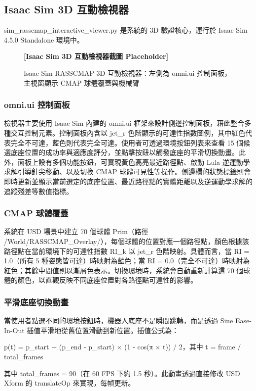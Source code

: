 \documentclass[a4paper, 12pt]{article}
\begin{document}
\subsection{Isaac Sim 3D 互動檢視器}
\label{subsec:sim_viewer}

sim\_rasscmap\_interactive\_viewer.py 是系統的 3D 驗證核心，運行於 Isaac Sim 4.5.0 Standalone 環境中。

\begin{figure}[H]
    \centering
    \textbf{[Isaac Sim 3D 互動檢視器截圖 Placeholder]}
    \caption{Isaac Sim RASSCMAP 3D 互動檢視器：左側為 omni.ui 控制面板，主視窗顯示 CMAP 球體覆蓋與機械臂}
    \label{fig:sim_viewer}
\end{figure}

\subsubsection{omni.ui 控制面板}

檢視器主要使用 Isaac Sim 內建的 omni.ui 框架來設計側邊控制面板，藉此整合多種交互控制元素。控制面板內含以 jet\_r 色階顯示的可達性指數圖例，其中紅色代表完全不可達，藍色則代表完全可達。使用者可透過環境按鈕列表來查看 15 個候選底座位置的成功率與適應度評分，並點擊按鈕以觸發底座的平滑切換動畫。此外，面板上設有多個功能按鈕，可實現黃色高亮最近路徑點、啟動 Lula 逆運動學求解引導針尖移動、以及切換 CMAP 球體可見性等操作。側邊欄的狀態標籤則會即時更新並顯示當前選定的底座位置、最近路徑點的實體距離以及逆運動學求解的追蹤殘差等數值指標。

\subsubsection{CMAP 球體覆蓋}

系統在 USD 場景中建立 70 個球體 Prim（路徑 /World/RASSCMAP\_Overlay/），每個球體的位置對應一個路徑點，顏色根據該路徑點在當前環境下的可達性指數 RI\_k 以 jet\_r 色階映射。具體而言，當 RI = 1.0（所有 5 種姿態皆可達）時映射為藍色；當 RI = 0.0（完全不可達）時映射為紅色；其餘中間值則以漸層色表示。切換環境時，系統會自動重新計算這 70 個球體的顏色，以直觀反映不同底座位置對各路徑點可達性的影響。

\subsubsection{平滑底座切換動畫}

當使用者點選不同的環境按鈕時，機器人底座不是瞬間跳轉，而是透過 Sine Ease-In-Out 插值平滑地從舊位置滑動到新位置。插值公式為：
\begin{center}
p(t) = p\_start + (p\_end - p\_start) × (1 - cos(π × t)) / 2，其中 t = frame / total\_frames
\end{center}
其中 total\_frames = 90（在 60 FPS 下約 1.5 秒）。此動畫透過直接修改 USD Xform 的 translateOp 來實現，每幀更新。
\end{document}
